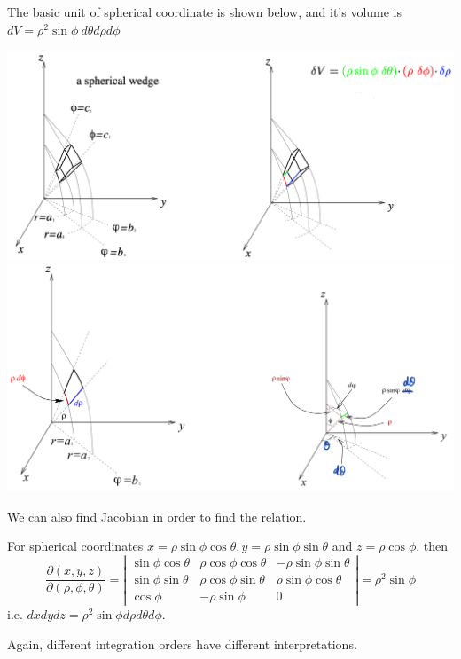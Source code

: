 \begin{spacing}{1.3}
    The basic unit of spherical coordinate is shown below, and it's volume is 
    $dV=\rho^2 \sin\phi \ d\theta d\rho d\phi$
    \begin{center}
        \includegraphics[scale=0.35]{images/Ch14-int-sphere-1.png}
        \includegraphics[scale=0.2]{images/Ch14-int-sphere-2.jpeg}
    \end{center}
    We can also find Jacobian in order to find the relation. 

    For spherical coordinates $x=\rho \sin \phi \cos \theta, y=\rho \sin \phi \sin \theta$ and $z=\rho \cos \phi$, then
    $$
    \frac{\partial(x, y, z)}{\partial(\rho, \phi, \theta)}=\left|\begin{array}{ccc}
    \sin \phi \cos \theta & \rho \cos \phi \cos \theta & -\rho \sin \phi \sin \theta \\
    \sin \phi \sin \theta & \rho \cos \phi \sin \theta & \rho \sin \phi \cos \theta \\
    \cos \phi & -\rho \sin \phi & 0
    \end{array}\right|=\rho^{2} \sin \phi
    $$
    i.e. $d x d y d z=\rho^{2} \sin \phi d \rho d \theta d \phi$.

    \vspace{0.5in}
    Again, different integration orders have different interpretations.


\end{spacing}
